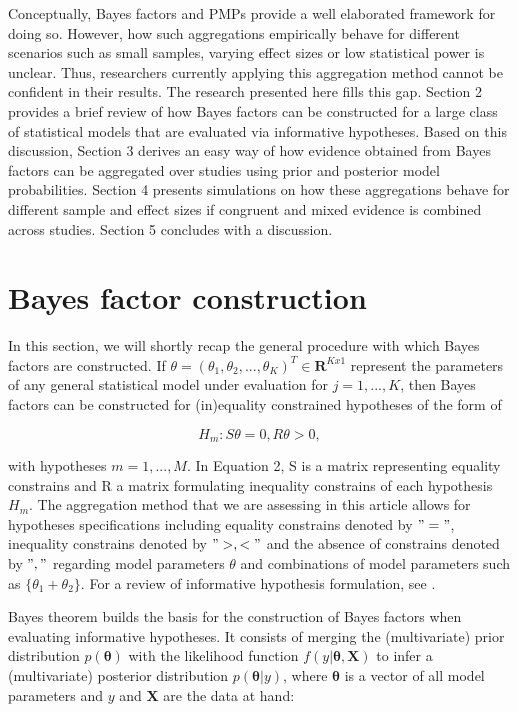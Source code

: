 \documentclass[11pt, a4paper]{article} %
\begin{document}
Conceptually, Bayes factors and PMPs provide a well elaborated framework for doing so. However, how such aggregations empirically behave for different scenarios such as small samples, varying effect sizes or low statistical power is unclear. Thus, researchers currently applying this aggregation method cannot be confident in their results. The research presented here fills this gap. Section 2 provides a brief review of how Bayes factors can be constructed for a large class of statistical models that are evaluated via informative hypotheses. Based on this discussion, Section 3 derives an easy way of how evidence obtained from Bayes factors  can be aggregated over studies using prior and posterior model probabilities. Section 4 presents simulations on how these aggregations behave for different sample and effect sizes if congruent and mixed evidence is combined across studies. Section 5 concludes with a discussion.  

\section{Bayes factor construction}
In this section, we will shortly recap the general procedure with which Bayes factors are constructed. If $\theta=(\theta_1, \theta_2,...,\theta_K)^T \in \bm{R}^{Kx1}$ represent the parameters of any general statistical model under evaluation for $j=1,...,K$, then Bayes factors can be constructed for (in)equality constrained hypotheses of the form of 

\begin{equation}
H_m: S\theta=0, R\theta>0,
\end{equation}

\noindent with hypotheses $m=1,...,M$. In Equation 2, S is a matrix representing equality constrains and R a matrix formulating inequality constrains of each hypothesis $H_m$. The aggregation method that we are assessing in this article allows for hypotheses specifications including equality constrains denoted by $"="$, inequality constrains denoted by $">,<"$ and the absence of constrains denoted by $","$ regarding model parameters $\theta$ and combinations of model parameters such as $\{ \theta_1+\theta_2 \}$. For a review of informative hypothesis formulation, see \citet{Hoijtink2012}. 

Bayes theorem builds the basis for the construction of Bayes factors when evaluating informative hypotheses. It consists of merging the (multivariate) prior distribution $p(\bm{\theta})$ with the likelihood function $f(y|\bm{\theta,X})$ to infer a (multivariate) posterior distribution $p(\bm{\theta}|y)$, where $\bm{\theta}$ is a vector of all model parameters and $y$ and \textbf{X} are the data at hand: 
\end{document}
